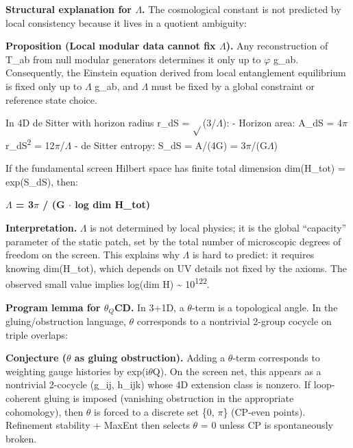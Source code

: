\documentclass[11pt,a4paper]{article}
\theoremstyle{remark}
\begin{document}
\textbf{Structural explanation for \ensuremath{\Lambda}.} The cosmological constant is not predicted by local consistency because it lives in a quotient ambiguity:

\textbf{Proposition (Local modular data cannot fix \ensuremath{\Lambda}).} Any reconstruction of T\_ab from null modular generators determines it only up to \ensuremath{\varphi} g\_ab. Consequently, the Einstein equation derived from local entanglement equilibrium is fixed only up to \ensuremath{\Lambda} g\_ab, and \ensuremath{\Lambda} must be fixed by a global constraint or reference state choice.

In 4D de Sitter with horizon radius r\_dS = \ensuremath{\sqrt{}}(3/\ensuremath{\Lambda}):
- Horizon area: A\_dS = 4\ensuremath{\pi} r\_dS\textsuperscript{2} = 12\ensuremath{\pi}/\ensuremath{\Lambda}
- de Sitter entropy: S\_dS = A/(4G) = 3\ensuremath{\pi}/(G\ensuremath{\Lambda})

If the fundamental screen Hilbert space has finite total dimension dim(H\_tot) = exp(S\_dS), then:

\textbf{\ensuremath{\Lambda} = 3\ensuremath{\pi} / (G \ensuremath{\cdot} log dim H\_tot)}

\textbf{Interpretation.} \ensuremath{\Lambda} is not determined by local physics; it is the global ``capacity'' parameter of the static patch, set by the total number of microscopic degrees of freedom on the screen. This explains why \ensuremath{\Lambda} is hard to predict: it requires knowing dim(H\_tot), which depends on UV details not fixed by the axioms. The observed small value implies log(dim H) \textasciitilde{} 10\textsuperscript{122}.

\textbf{Program lemma for \(\theta{}_Q\)CD.} In 3+1D, a \ensuremath{\theta}-term is a topological angle. In the gluing/obstruction language, \ensuremath{\theta} corresponds to a nontrivial 2-group cocycle on triple overlaps:

\textbf{Conjecture (\ensuremath{\theta} as gluing obstruction).} Adding a \ensuremath{\theta}-term corresponds to weighting gauge histories by exp(i\ensuremath{\theta}Q). On the screen net, this appears as a nontrivial 2-cocycle (g\_ij, h\_ijk) whose 4D extension class is nonzero. If loop-coherent gluing is imposed (vanishing obstruction in the appropriate cohomology), then \ensuremath{\theta} is forced to a discrete set \{0, \ensuremath{\pi}\} (CP-even points). Refinement stability + MaxEnt then selects \ensuremath{\theta} = 0 unless CP is spontaneously broken.
\end{document}
